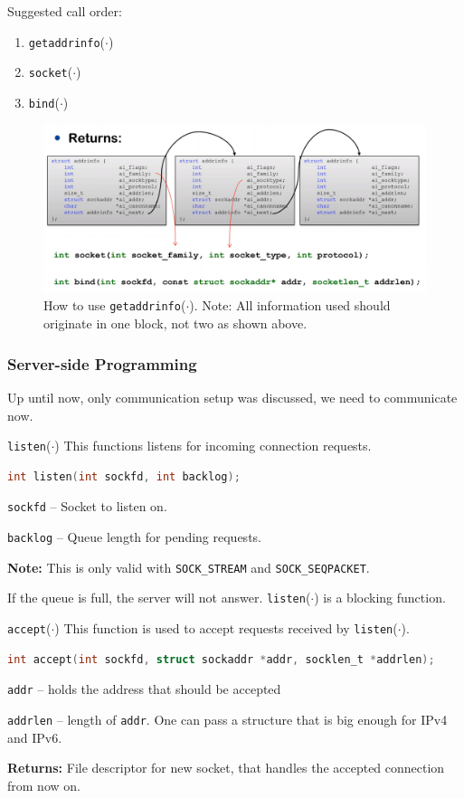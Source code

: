 \documentclass[english]{panikzettel}
\newcommand{\fkt}[1]{\texttt{#1}(\(\cdot\))}
\begin{document}
	Suggested call order:
	\begin{enumerate}
		\item \fkt{getaddrinfo}
		\item \fkt{socket}
		\item \fkt{bind}
	\end{enumerate}

	\begin{figure}[H]
		\centering
		\includegraphics[width=\textwidth]{img/1-getaddrinfo-usage.png}
		\caption{How to use \fkt{getaddrinfo}. Note: All information used should originate in one block, not two as shown above.}
		\label{img-1-getaddrinfo-usage}
	\end{figure}	
	
	\subsubsection{Server-side Programming}

	Up until now, only communication setup was discussed, we need to communicate now.

	\begin{defi}{\fkt{listen}}
		This functions listens for incoming connection requests.
		\begin{lstlisting}[language=C]
				int listen(int sockfd, int backlog);
		\end{lstlisting}
		\tcblower
		\texttt{sockfd} – Socket to listen on.	
		
		\texttt{backlog} – Queue length for pending requests.
	
		\textbf{Note:} This is only valid with \texttt{SOCK\_STREAM} and \texttt{SOCK\_SEQPACKET}.
	\end{defi}
	If the queue is full, the server will not answer.
	\fkt{listen} is a blocking function.

	\begin{defi}{\fkt{accept}}
		This function is used to accept requests received by \fkt{listen}.
		\begin{lstlisting}[language=C]
			int accept(int sockfd, struct sockaddr *addr, socklen_t *addrlen);
		\end{lstlisting}
		\tcblower
		\texttt{addr} – holds the address that should be accepted
		
		\texttt{addrlen} – length of \texttt{addr}. One can pass a structure that is big enough for IPv4 and IPv6.

		\textbf{Returns:} File descriptor for new socket, that handles the accepted connection from now on.
	\end{defi}
\end{document}

